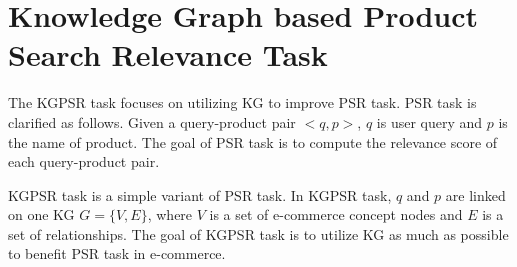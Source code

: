 \section{Knowledge Graph based Product Search Relevance Task}
The KGPSR task focuses on utilizing KG to improve PSR task. PSR task is clarified as follows. Given a query-product pair $<q, p>$, $q$ is user query and $p$ is the name of product. The goal of PSR task is to compute the relevance score of each query-product pair. 

KGPSR task is a simple variant of PSR task. In KGPSR task, $q$ and $p$ are linked on one KG $G=\{V,E\}$, where $V$ is a set of e-commerce concept nodes and $E$ is a set of relationships. The goal of KGPSR task is to utilize KG as much as possible to benefit PSR task in e-commerce.



